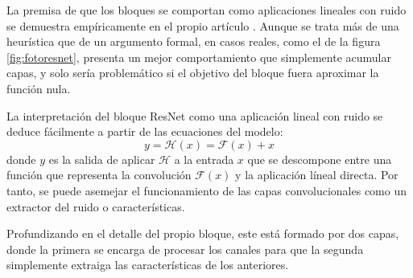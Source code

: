 \documentclass{article}
\begin{document}
	
	La premisa de que los bloques se comportan como aplicaciones lineales con ruido se demuestra empíricamente en el propio artículo \cite{he2015deepresiduallearningimage}. Aunque se trata más de una heurística que de un argumento formal, en casos reales, como el de la figura \ref{fig:fotoresnet}, presenta un mejor comportamiento que simplemente acumular capas, y solo sería problemático si el objetivo del bloque fuera aproximar la función nula.
	
	
	La interpretación del bloque ResNet como una aplicación lineal con ruido se deduce fácilmente a partir de las ecuaciones del modelo:
	\begin{equation}
		y=\mathcal{H}(x)=\mathcal{F}(x)+x
	\end{equation}
	donde \(y\) es la salida de aplicar \(\mathcal{H}\) a la entrada \(x\) que se descompone entre una función que representa la convolución \(\mathcal{F}(x)\) y la aplicación líneal directa. Por tanto, se puede asemejar el funcionamiento de las capas convolucionales como un extractor del ruido o características. 
	
	
	Profundizando en el detalle del propio bloque, este está formado por dos capas, donde la primera se encarga de procesar los canales para que la segunda simplemente extraiga las características de los anteriores.
	
\end{document}
